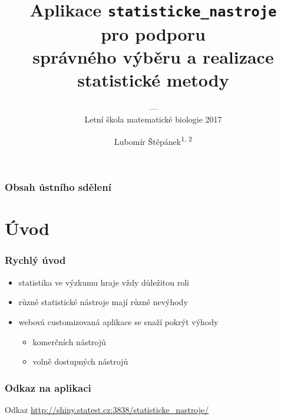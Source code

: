 \documentclass[t, compress]{beamer}
\title[%
  Aplikace pro podporu správného výběru
  a realizace statistické metody%
]{%
  Aplikace \texttt{statisticke\_nastroje} \\
  pro podporu \\ správného výběru
  a realizace statistické metody%
}
\subtitle{%
  \vspace{-0.15cm}
  --- \\
  \vspace{-0.05cm}
  Letní škola matematické biologie 2017%
}
\author[%
  Lubomír Štěpánek%
]{%
  \vspace{-0.15cm}Lubomír Štěpánek\textsuperscript{1, 2}\vspace{-0.15cm}
}
\institute{%

  \begin{minipage}{.30\textwidth}
    \vspace{+0.15cm}
    \centering
    {%
      \hspace{+1.5cm}
      \texttt{[image: lf1\_logo.eps]} \\
      \vspace{0.35cm}
      \hspace{+1.5cm}
      \texttt{[image: fbmi\_logo.eps]}%
    }
  \end{minipage}%
  \begin{minipage}{.70\textwidth}
    \textsuperscript{1}BIOSTAT \& Oddělení výpočetní techniky \\
    \phantom{\textsuperscript{1}}Ústav biofyziky a informatiky \\
    \phantom{\textsuperscript{1}}1. lékařská fakulta \\
    \phantom{\textsuperscript{1}}Univerzita Karlova v Praze \\
    \\
    \textsuperscript{2}Katedra biomedicínské informatiky \\
    \phantom{\textsuperscript{2}}Fakulta biomedicínského inženýrství \\
    \phantom{\textsuperscript{2}}České vysoké učení technické v Praze
  \end{minipage}
  
}
\date[14. září 2017]{\phantom{14. září 2017}}
\begin{document}

{
\miniframesoff %
\begin{frame}
  \titlepage
\end{frame}

\miniframeson  %
}



\miniframesoff
\begin{frame}
  \frametitle{%
    Obsah ústního sdělení%
  }
  \tableofcontents
\end{frame}
\miniframeson



\section{Úvod}


\begin{frame}
  \frametitle{%
    Rychlý úvod%
  }
  \begin{itemize}
    \item statistika ve výzkumu hraje vždy důležitou roli
    \item různé statistické nástroje mají různé nevýhody
    \item webová customizovaná aplikace se snaží pokrýt výhody
    \begin{itemize}
      \item komerčních nástrojů
      \item volně dostupných nástrojů
    \end{itemize}
  \end{itemize}
\end{frame}



\begin{frame}
  \frametitle{%
    Odkaz na aplikaci%
  }
  \vspace{+2.0cm}
  \begin{block}{\centering Odkaz}
    \center
    \href{%
      http://shiny.statest.cz:3838/statisticke\_nastroje/%
    }{%
      http://shiny.statest.cz:3838/statisticke\_nastroje/%
    }
  \end{block}
\end{frame}
\end{document}
